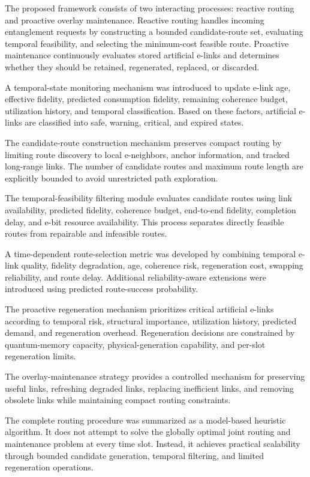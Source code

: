 The proposed framework consists of two interacting processes: reactive routing and proactive overlay maintenance. Reactive routing handles incoming entanglement requests by constructing a bounded candidate-route set, evaluating temporal feasibility, and selecting the minimum-cost feasible route. Proactive maintenance continuously evaluates stored artificial e-links and determines whether they should be retained, regenerated, replaced, or discarded.

A temporal-state monitoring mechanism was introduced to update e-link age, effective fidelity, predicted consumption fidelity, remaining coherence budget, utilization history, and temporal classification. Based on these factors, artificial e-links are classified into safe, warning, critical, and expired states.

The candidate-route construction mechanism preserves compact routing by limiting route discovery to local e-neighbors, anchor information, and tracked long-range links. The number of candidate routes and maximum route length are explicitly bounded to avoid unrestricted path exploration.

The temporal-feasibility filtering module evaluates candidate routes using link availability, predicted fidelity, coherence budget, end-to-end fidelity, completion delay, and e-bit resource availability. This process separates directly feasible routes from repairable and infeasible routes.

A time-dependent route-selection metric was developed by combining temporal e-link quality, fidelity degradation, age, coherence risk, regeneration cost, swapping reliability, and route delay. Additional reliability-aware extensions were introduced using predicted route-success probability.

The proactive regeneration mechanism prioritizes critical artificial e-links according to temporal risk, structural importance, utilization history, predicted demand, and regeneration overhead. Regeneration decisions are constrained by quantum-memory capacity, physical-generation capability, and per-slot regeneration limits.

The overlay-maintenance strategy provides a controlled mechanism for preserving useful links, refreshing degraded links, replacing inefficient links, and removing obsolete links while maintaining compact routing constraints.

The complete routing procedure was summarized as a model-based heuristic algorithm. It does not attempt to solve the globally optimal joint routing and maintenance problem at every time slot. Instead, it achieves practical scalability through bounded candidate generation, temporal filtering, and limited regeneration operations.

